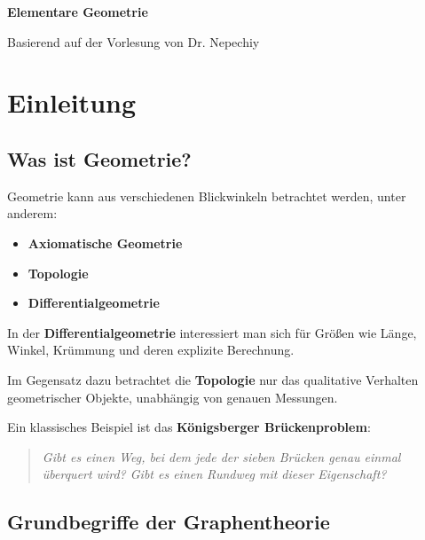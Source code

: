 \documentclass[a4paper,12pt]{article}
\theoremstyle{break}
\begin{document}
\begin{titlepage}
    \centering
    \vspace*{2cm}
    
    {\Huge\bfseries Elementare Geometrie \par}
    \vspace{1.5cm}
    
    {\Large Basierend auf der Vorlesung von Dr. Nepechiy \par}
    \vspace{2cm}
\end{titlepage}

\newpage
\tableofcontents
\newpage

\section{Einleitung}

\subsection{Was ist Geometrie?}
Geometrie kann aus verschiedenen Blickwinkeln betrachtet werden, unter anderem:

\begin{itemize}
    \item \textbf{Axiomatische Geometrie}
    \item \textbf{Topologie}
    \item \textbf{Differentialgeometrie}
\end{itemize}

In der \textbf{Differentialgeometrie} interessiert man sich für Größen wie Länge, Winkel, Krümmung und deren explizite Berechnung. 

Im Gegensatz dazu betrachtet die \textbf{Topologie} nur das qualitative Verhalten geometrischer Objekte, unabhängig von genauen \glqq Messungen\grqq{}.

Ein klassisches Beispiel ist das \textbf{Königsberger Brückenproblem}:

\begin{quote}
    \textit{Gibt es einen Weg, bei dem jede der sieben Brücken genau einmal überquert wird? Gibt es einen Rundweg mit dieser Eigenschaft?}
\end{quote}

\subsection{Grundbegriffe der Graphentheorie}
\end{document}
